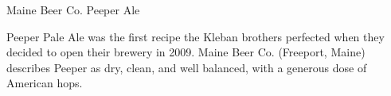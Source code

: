 \begin{recipie}{Maine Beer Co. Peeper Ale}

\begin{aboutblock}
Peeper Pale Ale was the first recipe the Kleban brothers perfected when they decided
to open their brewery in 2009. Maine Beer Co. (Freeport, Maine) describes Peeper as dry,
clean, and well balanced, with a generous dose of American hops.
\end{aboutblock}


\begin{methodandtiming}
 
\begin{mashsteps}
\end{mashsteps}

\begin{fermentationsteps}
\end{fermentationsteps}

\end{methodandtiming}

\pagebreak

\begin{ingredientsblock}

\begin{malts}
\end{malts}

\begin{hops}
\end{hops}

\begin{yeasts}
\end{yeasts}

\end{ingredientsblock}

\end{recipie}

